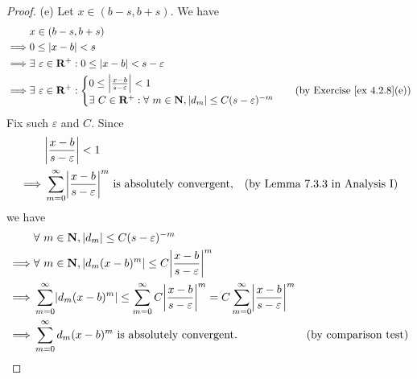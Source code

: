 \begin{proof}{(e)}
    Let \(x \in (b - s, b + s)\).
    We have
    \begin{align*}
                 & x \in (b - s, b + s)                                                                                                   \\
        \implies & 0 \leq \abs*{x - b} < s                                                                                                \\
        \implies & \exists\ \varepsilon \in \mathbf{R}^+ : 0 \leq \abs*{x - b} < s - \varepsilon                                          \\
        \implies & \exists\ \varepsilon \in \mathbf{R}^+ : \begin{cases}
            0 \leq \abs*{\frac{x - b}{s - \varepsilon}} < 1 \\
            \exists\ C \in \mathbf{R}^+ : \forall\ m \in \mathbf{N}, \abs*{d_m} \leq C (s - \varepsilon)^{-m}
        \end{cases}            & \text{(by Exercise \ref{ex 4.2.8}(e))}
    \end{align*}
    Fix such \(\varepsilon\) and \(C\).
    Since
    \begin{align*}
                 & \abs*{\frac{x - b}{s - \varepsilon}} < 1                                                                                             \\
        \implies & \sum_{m = 0}^\infty \abs*{\frac{x - b}{s - \varepsilon}}^m \text{ is absolutely convergent}, & \text{(by Lemma 7.3.3 in Analysis I)}
    \end{align*}
    we have
    \begin{align*}
                 & \forall\ m \in \mathbf{N}, \abs*{d_m} \leq C (s - \varepsilon)^{-m}                                                                                                                                         \\
        \implies & \forall\ m \in \mathbf{N}, \abs*{d_m (x - b)^m} \leq C \abs*{\frac{x - b}{s - \varepsilon}}^{m}                                                                                                             \\
        \implies & \sum_{m = 0}^\infty \abs*{d_m (x - b)^m} \leq \sum_{m = 0}^\infty C \abs*{\frac{x - b}{s - \varepsilon}}^{m} = C \sum_{m = 0}^\infty \abs*{\frac{x - b}{s - \varepsilon}}^{m}                               \\
        \implies & \sum_{m = 0}^\infty d_m (x - b)^m \text{ is absolutely convergent}.                                                                                                           & \text{(by comparison test)}

\end{align*}
\end{proof}
